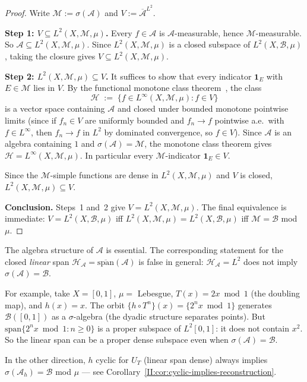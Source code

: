 \begin{proof}
Write $\mathcal{M} := \sigma(\mathcal{A})$ and $V := \overline{\mathcal{A}}^{L^2}$.

\textbf{Step 1: $V \subseteq L^2(X, \mathcal{M}, \mu)$.}
Every $f \in \mathcal{A}$ is $\mathcal{A}$-measurable, hence $\mathcal{M}$-measurable.
So $\mathcal{A} \subseteq L^2(X, \mathcal{M}, \mu)$.  Since $L^2(X, \mathcal{M}, \mu)$
is a closed subspace of $L^2(X, \mathcal{B}, \mu)$, taking the closure gives
$V \subseteq L^2(X, \mathcal{M}, \mu)$.

\textbf{Step 2: $L^2(X, \mathcal{M}, \mu) \subseteq V$.}
It suffices to show that every indicator $\mathbf{1}_E$ with $E \in \mathcal{M}$
lies in $V$.  By the functional monotone class theorem~\cite{Dynkin}, the class
\[
  \mathcal{H}
  \;:=\;
  \bigl\{f \in L^\infty(X, \mathcal{M}, \mu) : f \in V\bigr\}
\]
is a vector space containing $\mathcal{A}$ and closed under bounded monotone
pointwise limits (since if $f_n \in V$ are uniformly bounded and $f_n \to f$
pointwise a.e.\ with $f \in L^\infty$, then $f_n \to f$ in $L^2$ by dominated
convergence, so $f \in V$).  Since $\mathcal{A}$ is an algebra containing $1$
and $\sigma(\mathcal{A}) = \mathcal{M}$, the monotone class theorem gives
$\mathcal{H} = L^\infty(X, \mathcal{M}, \mu)$.  In particular every
$\mathcal{M}$-indicator $\mathbf{1}_E \in V$.

Since the $\mathcal{M}$-simple functions are dense in $L^2(X, \mathcal{M}, \mu)$
and $V$ is closed, $L^2(X, \mathcal{M}, \mu) \subseteq V$.

\textbf{Conclusion.}
Steps~1 and~2 give $V = L^2(X, \mathcal{M}, \mu)$.  The final equivalence is
immediate: $V = L^2(X, \mathcal{B}, \mu)$ iff $L^2(X, \mathcal{M}, \mu) =
L^2(X, \mathcal{B}, \mu)$ iff $\mathcal{M} = \mathcal{B}$ mod $\mu$.
\end{proof}

\begin{remark}
\label{II:rem:algebra-necessary}
The algebra structure of $\mathcal{A}$ is essential.  The corresponding
statement for the closed \emph{linear} span $\mathcal{H}_{\mathcal{A}} =
\overline{\mathrm{span}}(\mathcal{A})$ is false in general:
$\mathcal{H}_{\mathcal{A}} = L^2$ does not imply
$\sigma(\mathcal{A}) = \mathcal{B}$.

For example, take $X = [0,1]$, $\mu = $ Lebesgue, $T(x) = 2x \bmod 1$ (the
doubling map), and $h(x) = x$.  The orbit $\{h \circ T^n\}(x) = \{2^n x \bmod 1\}$
generates $\mathcal{B}([0,1])$ as a $\sigma$-algebra (the dyadic structure separates
points).  But $\mathrm{span}\{2^n x \bmod 1 : n \geq 0\}$ is a proper subspace of
$L^2[0,1]$: it does not contain $x^2$.  So the linear span can be a proper dense
subspace even when $\sigma(\mathcal{A}) = \mathcal{B}$.

In the other direction, $h$ cyclic for $U_T$ (linear span dense) always implies
$\sigma(\mathcal{A}_h) = \mathcal{B}$ mod $\mu$ — see
Corollary~\ref{II:cor:cyclic-implies-reconstruction}.
\end{remark}


